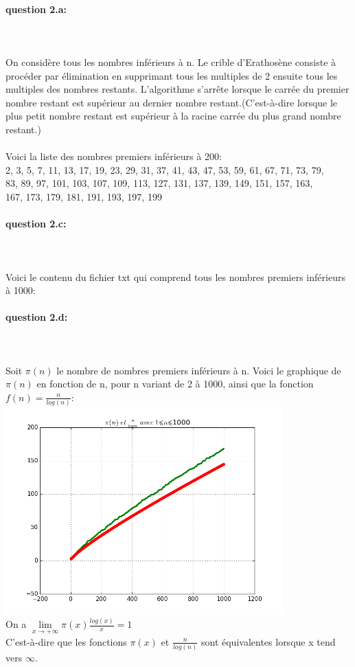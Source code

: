 \documentclass{article}
\begin{document}
\paragraph{question 2.a:}
~~\\
\\
On considère tous les nombres inférieurs à n. Le crible d'Erathosène consiste à procéder par élimination en supprimant tous les multiples de 2 ensuite tous les multiples des nombres restants. L'algorithme s'arrête lorsque le carrée du premier nombre restant est supérieur au dernier nombre restant.(C'est-à-dire lorsque le plus petit nombre restant est supérieur à la racine carrée du plus grand nombre restant.)
\\
\\
Voici la liste des nombres premiers inférieurs à 200:
\\
2, 3, 5, 7, 11, 13, 17, 19, 23, 29, 31, 37, 41, 43, 47, 53, 59, 61, 67, 71, 73, 79,\\ 83, 89, 97, 101, 103, 107, 109, 113, 127, 131, 137, 139, 149, 151, 157, 163,\\ 167, 173, 179, 181, 191, 193, 197, 199

\paragraph{question 2.c:}
~~\\
\\
Voici le contenu du fichier txt qui comprend tous les nombres premiers inférieurs à 1000:


\paragraph{question 2.d:}
~~\\
\\
Soit $\pi(n)$ le nombre de nombres premiers inférieurs à n. Voici le graphique de $\pi(n)$ en fonction de n, pour n variant de 2 à 1000, ainsi que la fonction $f(n)=\frac{n}{log(n)}$:
\\
\includegraphics[height=8cm]{n_1000.png}
\\
On a $\lim\limits_{x \rightarrow +\infty} \pi(x)\frac{log(x)}{x}=1$
\\
C'est-à-dire que les fonctions $\pi(x)$ et $\frac{n}{log(n)}$ sont équivalentes lorsque x tend vers $\infty$.
\end{document}
